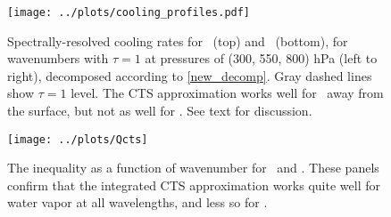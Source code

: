 \documentclass[10pt]{article}
\begin{document}
\begin{figure}[h]
	\begin{center}
			\texttt{[image: ../plots/cooling\_profiles.pdf]}
		\caption{Spectrally-resolved cooling rates for \htwo\ (top) and \cotwo\ (bottom), for  wavenumbers with $\tau=1$ at pressures of (300, 550, 800) hPa (left to right), decomposed according to  \eqref{new_decomp}. Gray dashed lines show $\tau=1$ level. The CTS approximation works well for \htwo\ away from the surface, but not as well for \cotwo. See text for discussion.
		\label{cooling_profiles}
		}
	\end{center}
\end{figure}

\begin{figure}[h]
	\begin{center}
			\texttt{[image: ../plots/Qcts]}
		\caption{The inequality  as a function of wavenumber for \htwo\ and \cotwo. These panels confirm that the integrated CTS approximation works quite well for water vapor at all wavelengths, and less so for \cotwo.
		\label{Qcts}
		}
	\end{center}
\end{figure}



%
%
\end{document}
